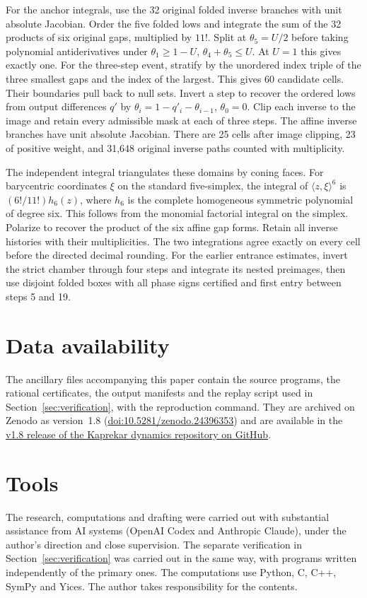 \documentclass[11pt,reqno]{amsart}
\theoremstyle{definition}
\begin{document}
For the anchor integrals, use the 32 original folded inverse
branches with unit absolute Jacobian. Order the five folded lows
and integrate the sum of the 32 products of six original gaps,
multiplied by \(11!\). Split at \(\theta_5=U/2\) before taking polynomial
antiderivatives under \(\theta_1\ge1-U\), \(\theta_4+\theta_5\le U\).
At \(U=1\) this gives exactly one. For the three-step event,
stratify by the unordered index triple of the three smallest
gaps and the index of the largest. This gives 60 candidate cells.
Their boundaries pull back to null sets. Invert a step to
recover the ordered lows from output differences \(q'\) by
\(\theta_i=1-q'_i-\theta_{i-1}\), \(\theta_0=0\). Clip each inverse to
the image and retain every admissible mask at each of three
steps. The affine inverse branches have unit absolute Jacobian.
There are 25 cells after image clipping, 23 of positive weight,
and 31,648 original inverse paths counted with multiplicity.

The independent integral triangulates these domains by coning
faces. For barycentric coordinates \(\xi\) on the standard
five-simplex, the integral of \(\langle z,\xi\rangle^6\) is
\((6!/11!)h_6(z)\), where \(h_6\) is the complete homogeneous
symmetric polynomial of degree six. This follows from the
monomial factorial integral on the simplex. Polarize to recover
the product of the six affine gap forms. Retain all inverse
histories with their multiplicities. The two integrations agree
exactly on every cell before the directed decimal rounding.
For the earlier entrance estimates, invert the strict chamber
through four steps and integrate its nested preimages, then
use disjoint folded boxes with all phase signs certified and
first entry between steps 5 and 19.

\section*{Data availability}
The ancillary files accompanying this paper contain the source programs,
the rational certificates, the output manifests and the replay script used
in Section~\ref{sec:verification}, with the reproduction command. They are
archived on Zenodo as version~1.8
(\href{https://doi.org/10.5281/zenodo.24396353}{doi:10.5281/zenodo.24396353}) and are available in the
\href{https://github.com/galyavin/kaprekar-dynamics/releases/tag/v1.8}{v1.8 release of the Kaprekar dynamics repository on GitHub}.

\section*{Tools}
The research, computations and drafting were carried out with substantial
assistance from AI systems (OpenAI Codex and Anthropic Claude), under the
author's direction and close supervision. The separate verification in
Section~\ref{sec:verification} was carried out in the same way, with programs
written independently of the primary ones. The computations use Python,
C, C++, SymPy and Yices. The author takes responsibility for the contents.
\end{document}
